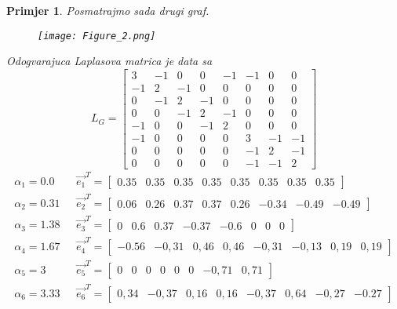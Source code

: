 \documentclass[11pt]{article}
\newtheorem{example}{Primjer}
\begin{document}
	\begin{example}
		Posmatrajmo sada drugi graf.
		\begin{figure}[h]
			\centering
			\texttt{[image: Figure\_2.png]}
		\end{figure}
		Odogvarajuca Laplasova matrica je data sa
		\[ 
		L_G =
		\begin{bmatrix}
		3 & -1 & 0 & 0 & -1 & -1 & 0 & 0 \\
		-1 & 2 & -1 & 0 & 0 & 0 & 0 & 0 \\
		0 & -1 & 2 & -1 & 0 & 0 & 0 & 0 \\
		0 & 0 & -1 & 2 & -1 & 0 & 0 & 0 \\
		-1 & 0 & 0 & -1 & 2 & 0 & 0 & 0 \\
		-1 & 0 & 0 & 0 & 0 & 3 & -1 & -1 \\
		0 & 0 & 0 & 0 & 0 & -1 & 2 & -1 \\
		0 & 0 & 0 & 0 & 0 & -1 & -1 & 2
		\end{bmatrix}
		\]
        \[
            \begin{split}
                \alpha_1=0.0 \text{      } & \vec{e_1}^T = \begin{bmatrix} 0.35  &   0.35  &  0.35  &  0.35  &  0.35  &  0.35  &  0.35  &  0.35      \end{bmatrix} \\ 
                \alpha_2=0.31 \text{     } & \vec{e_2}^T = \begin{bmatrix} 0.06  &   0.26  &  0.37  &  0.37  &  0.26  &  -0.34  &  -0.49  &  -0.49  \end{bmatrix} \\ 
                \alpha_3=1.38 \text{     } & \vec{e_3}^T = \begin{bmatrix} 0  &  0.6  &  0.37  &  -0.37  &  -0.6  &  0  &  0  &  0                  \end{bmatrix} \\
                \alpha_4=1.67 \text{     } & \vec{e_4}^T = \begin{bmatrix} -0.56  &  -0,31  &  0,46  &  0,46  &  -0,31  &  -0,13  &  0,19  &  0,19   \end{bmatrix} \\
                \alpha_5=3 \text{        } & \vec{e_5}^T = \begin{bmatrix} 0  &  0  &  0  &  0  &  0  &  0  & -0,71  &  0,71                         \end{bmatrix} \\
                \alpha_6=3.33 \text{     } & \vec{e_6}^T = \begin{bmatrix} 0,34  &  -0,37  &  0,16  &  0,16  &  -0,37  &  0,64  &  -0,27  &  -0.27   \end{bmatrix} \\

\end{split}\]
\end{example}
\end{document}
